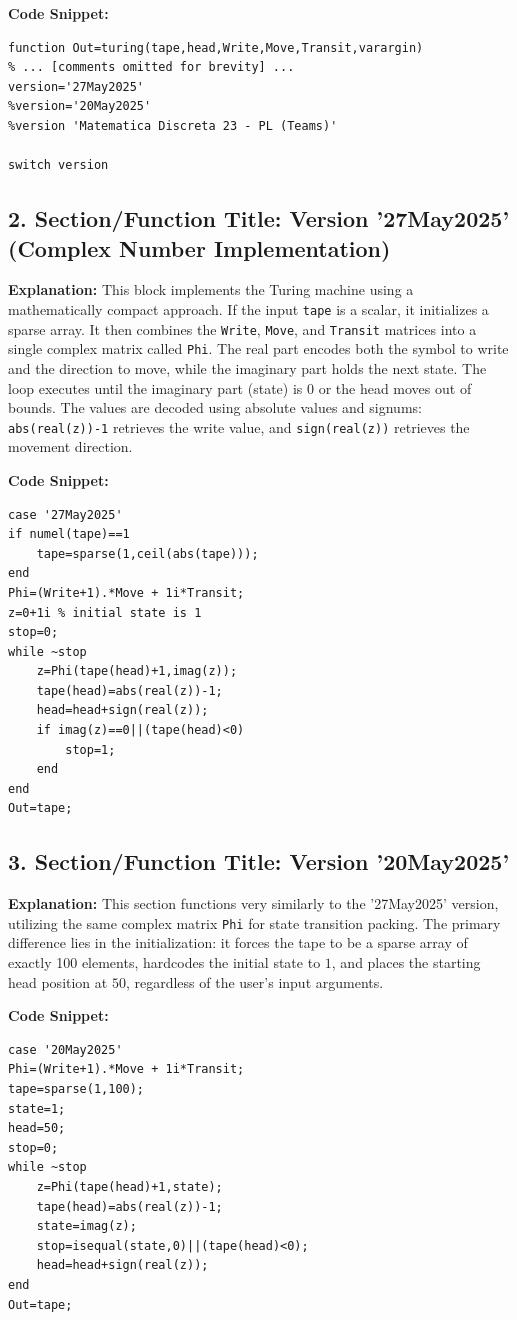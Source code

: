 \textbf{Code Snippet:}
\begin{lstlisting}
function Out=turing(tape,head,Write,Move,Transit,varargin)
% ... [comments omitted for brevity] ...
version='27May2025'
%version='20May2025'
%version 'Matematica Discreta 23 - PL (Teams)'

switch version
\end{lstlisting}

\subsection*{2. Section/Function Title: Version '27May2025' (Complex Number Implementation)}
\textbf{Explanation:} This block implements the Turing machine using a mathematically compact approach. If the input \texttt{tape} is a scalar, it initializes a sparse array. It then combines the \texttt{Write}, \texttt{Move}, and \texttt{Transit} matrices into a single complex matrix called \texttt{Phi}. The real part encodes both the symbol to write and the direction to move, while the imaginary part holds the next state. The loop executes until the imaginary part (state) is $0$ or the head moves out of bounds. The values are decoded using absolute values and signums: \texttt{abs(real(z))-1} retrieves the write value, and \texttt{sign(real(z))} retrieves the movement direction.

\textbf{Code Snippet:}
\begin{lstlisting}
case '27May2025'
if numel(tape)==1
    tape=sparse(1,ceil(abs(tape)));
end
Phi=(Write+1).*Move + 1i*Transit;
z=0+1i % initial state is 1
stop=0;
while ~stop
    z=Phi(tape(head)+1,imag(z));
    tape(head)=abs(real(z))-1;
    head=head+sign(real(z));
    if imag(z)==0||(tape(head)<0)
        stop=1;
    end    
end
Out=tape;
\end{lstlisting}

\subsection*{3. Section/Function Title: Version '20May2025'}
\textbf{Explanation:} This section functions very similarly to the '27May2025' version, utilizing the same complex matrix \texttt{Phi} for state transition packing. The primary difference lies in the initialization: it forces the tape to be a sparse array of exactly 100 elements, hardcodes the initial state to $1$, and places the starting head position at $50$, regardless of the user's input arguments.

\textbf{Code Snippet:}
\begin{lstlisting}
case '20May2025'
Phi=(Write+1).*Move + 1i*Transit;
tape=sparse(1,100);
state=1;
head=50;
stop=0;
while ~stop
    z=Phi(tape(head)+1,state);
    tape(head)=abs(real(z))-1;
    state=imag(z);
    stop=isequal(state,0)||(tape(head)<0);
    head=head+sign(real(z));
end
Out=tape;
\end{lstlisting}

